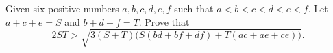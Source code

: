 Given six positive numbers $a, b, c, d, e, f$ such that $a < b < c < d < e < f$. Let $a + c + e = S$ and $b + d + f = T$. Prove that
\[
2ST > \sqrt{3(S+T)\big(S(bd + bf + df) + T(ac + ae + ce)\big)}.
\]

